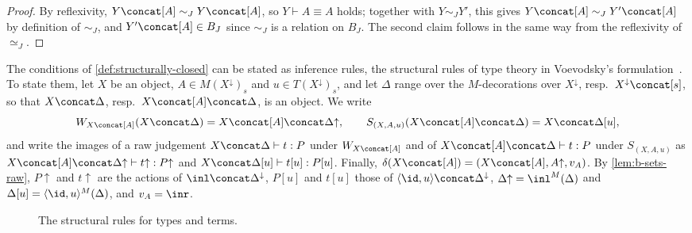 \begin{proof}
    By reflexivity, $Y \concat [A] \sim_J Y \concat [A]$, so $Y \vdash A \equiv A$ holds; together with $Y \sim_J Y'$, this gives $Y \concat [A] \sim_J Y' \concat [A]$ by definition of $\sim_J$, and $Y' \concat [A] \in B_J$ since $\sim_J$ is a relation on $B_J$. The second claim follows in the same way from the reflexivity of $\simeq_J$.
\end{proof}

The conditions of \cref{def:structurally-closed} can be stated as inference rules, the structural rules of type theory in Voevodsky's formulation~\cite[Rem.~4.2 and Prop.~6.2]{Voevodsky2014Module}. To state them, let $X$ be an object, $A \in M(X^{\downarrow})_s$ and $u \in T(X^{\downarrow})_s$, and let $\Delta$ range over the $M$-decorations over $X^{\downarrow}$, resp.\ $X^{\downarrow} \concat [s]$, so that $X \concat \Delta$, resp.\ $X \concat [A] \concat \Delta$, is an object. We write
\[
    W_{X \concat [A]}(X \concat \Delta) = X \concat [A] \concat \Delta{\uparrow}, \qquad
    S_{(X, A, u)}(X \concat [A] \concat \Delta) = X \concat \Delta[u],
\]
and write the images of a raw judgement $X \concat \Delta \vdash t : P$ under $W_{X \concat [A]}$ and of $X \concat [A] \concat \Delta \vdash t : P$ under $S_{(X, A, u)}$ as $X \concat [A] \concat \Delta{\uparrow} \vdash t{\uparrow} : P{\uparrow}$ and $X \concat \Delta[u] \vdash t[u] : P[u]$. Finally, $\delta(X \concat [A]) = (X \concat [A], A{\uparrow}, v_A)$. By \cref{lem:b-sets-raw}, $P{\uparrow}$ and $t{\uparrow}$ are the actions of $\inl \concat \Delta^{\downarrow}$, $P[u]$ and $t[u]$ those of $\langle \id, u \rangle \concat \Delta^{\downarrow}$, $\Delta{\uparrow} = \inl^M(\Delta)$ and $\Delta[u] = \langle \id, u \rangle^M(\Delta)$, and $v_A = \inr$.

\begin{figure}[ht]
    \centering
    \caption{The structural rules for types and terms.}
    \label{fig:structural-rules}
\end{figure}


